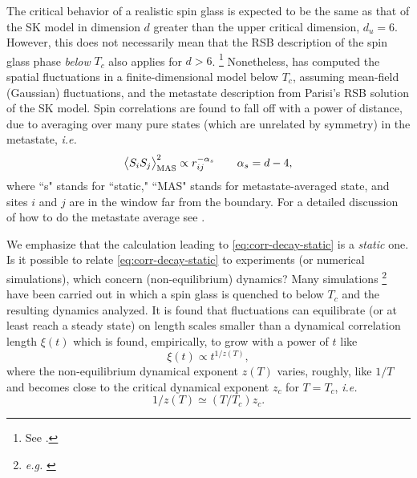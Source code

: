 The critical behavior of a realistic spin glass is expected to be the same as
that of the SK model in dimension $d$ greater than the upper critical
dimension, $d_u=6$. However, this does not necessarily mean that the RSB
description of the spin glass phase \emph{below} $T_c$ also applies for $d>6$.%
\footnote{%
  See
  \textcite{%
    newman1997metastate,%
    fisher1987absence,%
    fisher1988equilibrium,%
    moore2011disappearance%
  }.
}
Nonetheless, \textcite{read2014short} has computed the spatial fluctuations in a
finite-dimensional model below $T_c$, assuming mean-field (Gaussian) fluctuations,
and the metastate description from Parisi's RSB solution of the SK model. Spin
correlations are found to fall off with a power of distance, due to averaging
over many pure states (which are unrelated by symmetry) in the metastate, \emph{i.e.}
\begin{equation}
  \left< S_i S_j \right>_{\mathrm{MAS}}^2 \propto r_{ij}^{-\alpha_s}\qquad
  \alpha_s = d - 4,
  \label{eq:corr-decay-static}
\end{equation}
where ``s" stands for ``static," ``MAS" stands for metastate-averaged state,
and sites $i$ and $j$ are in the window far from the boundary. For a detailed
discussion of how to do the metastate average see \textcite{read2014short}.

We emphasize that the calculation leading to \cref{eq:corr-decay-static}
is a \emph{static} one.
Is it possible to relate \cref{eq:corr-decay-static} to experiments (or
numerical simulations), which concern (non-equilibrium) dynamics?
Many simulations%
\footnote{%
  \textit{e.g.}
  \textcite{%
    manssen2015aging,%
    rieger1993nonequilibrium,%
    marinari1996numerical%
  }
}
have been carried out in which a spin glass is quenched to below $T_c$ and the
resulting dynamics analyzed. It is found that fluctuations can equilibrate (or
at least reach a steady state) on length scales smaller than a dynamical
correlation length $\xi(t)$ which is found, empirically, to grow with a power
of $t$ like
\begin{equation}
  \xi(t) \propto t^{1/z(T)},
  \label{eq:xi-scaling}
\end{equation}
where the non-equilibrium dynamical exponent $z(T)$ varies, roughly, like $1/T$
and becomes close to the critical dynamical exponent $z_c$ for $T=T_c$,
\textit{i.e.}
\begin{equation}
  1/z(T) \simeq (T/T_c) z_c.
\end{equation}

